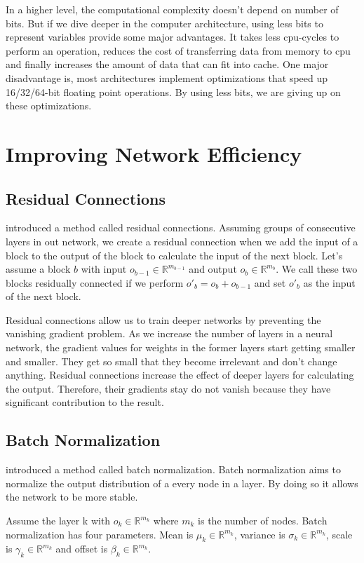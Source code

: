 In a higher level, the computational complexity doesn't depend on number of bits. But if we dive deeper in the computer architecture, using less bits to represent variables provide some major advantages. It takes less cpu-cycles to perform an operation, reduces the cost of transferring data from memory to cpu and finally increases the amount of data that can fit into cache. One major disadvantage is, most architectures implement optimizations that speed up 16/32/64-bit floating point operations. By using less bits, we are giving up on these optimizations. 

\section{Improving Network Efficiency}

\subsection{Residual Connections}
\cite{He:2015aa} introduced a method called residual connections. Assuming groups of consecutive layers in out network, we create a residual connection when we add the input of a block to the output of the block to calculate the input of the next block. Let's assume a block $b$ with input $o_{b-1} \in \mathbb{R}^{m_{b-1}}$ and output  $o_{b} \in \mathbb{R}^{m_{b}}$. We call these two blocks residually connected if we perform $o'_b = o_b + o_{b-1}$ and set $o'_b$ as the input of the next block. 

Residual connections allow us to train deeper networks by preventing the vanishing gradient problem. As we increase the number of layers in a neural network, the gradient values for weights in the former layers start getting smaller and smaller. They get so small that they become irrelevant and don't change anything. Residual connections increase the effect of deeper layers for calculating the output. Therefore, their gradients stay do not vanish because they have significant contribution to the result.

\subsection{Batch Normalization}
\cite{ioffe2015batch} introduced a method called batch normalization. Batch normalization aims to normalize the output distribution of a every node in a layer. By doing so it allows the network to be more stable. 

Assume the layer k with $o_k \in \mathbb{R}^{m_k}$ where $m_k$ is the number of nodes. Batch normalization has four parameters. Mean is $\mu_k \in \mathbb{R}^{m_k}$, variance is $\sigma_k \in \mathbb{R}^{m_k}$, scale is $\gamma_k \in \mathbb{R}^{m_k}$ and offset is $\beta_k \in \mathbb{R}^{m_k}$. 

